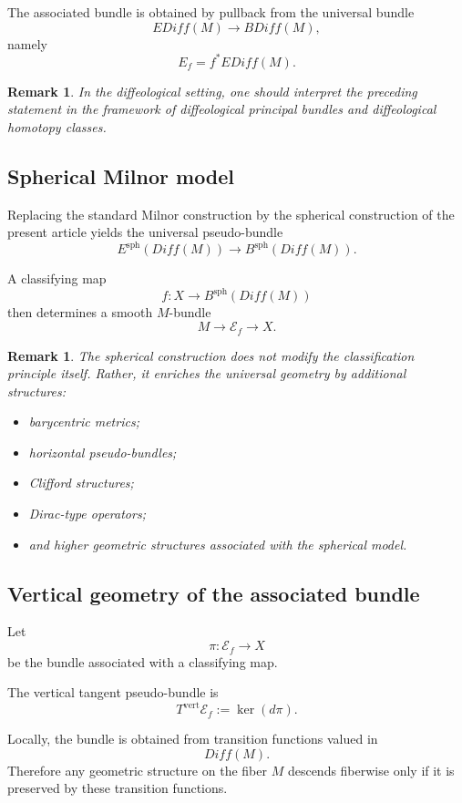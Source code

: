 \documentclass[11pt]{amsart}
\newtheorem{remark}[theorem]{Remark}
\begin{document}
The associated bundle is obtained by pullback from the universal bundle
\[
EDiff(M)\longrightarrow BDiff(M),
\]
namely
\[
E_f=f^*EDiff(M).
\]

\begin{remark}
In the diffeological setting, one should interpret the preceding statement in
the framework of diffeological principal bundles and diffeological homotopy
classes.
\end{remark}

\subsection{Spherical Milnor model}

Replacing the standard Milnor construction by the spherical construction of the
present article yields the universal pseudo-bundle
\[
E^{\mathrm{sph}}(Diff(M))
\longrightarrow
B^{\mathrm{sph}}(Diff(M)).
\]

A classifying map
\[
f:X\longrightarrow B^{\mathrm{sph}}(Diff(M))
\]
then determines a smooth \(M\)-bundle
\[
M\longrightarrow \mathcal E_f\longrightarrow X.
\]

\begin{remark}
The spherical construction does not modify the classification principle itself.
Rather, it enriches the universal geometry by additional structures:
\begin{itemize}
\item barycentric metrics;
\item horizontal pseudo-bundles;
\item Clifford structures;
\item Dirac-type operators;
\item and higher geometric structures associated with the spherical model.
\end{itemize}
\end{remark}

\subsection{Vertical geometry of the associated bundle}

Let
\[
\pi:\mathcal E_f\longrightarrow X
\]
be the bundle associated with a classifying map.

The vertical tangent pseudo-bundle is
\[
T^{\mathrm{vert}}\mathcal E_f
:=
\ker(d\pi).
\]

Locally, the bundle is obtained from transition functions valued in
\[
Diff(M).
\]
Therefore any geometric structure on the fiber \(M\) descends fiberwise only
if it is preserved by these transition functions.
\end{document}
